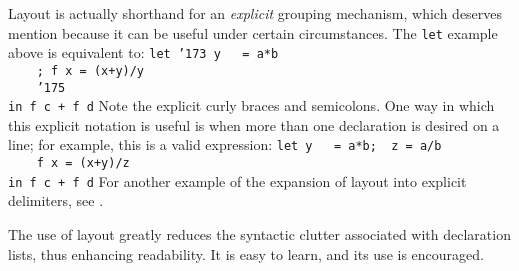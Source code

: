 Layout is actually shorthand for an {\em explicit} grouping mechanism,
which deserves mention because it can be useful under certain
circumstances.  The \mbox{\tt let} example above is equivalent to:
\bprog
\mbox{\tt let\ {\char'173}\ y\ \ \ =\ a*b}\\
\mbox{\tt \ \ \ \ ;\ f\ x\ =\ (x+y)/y}\\
\mbox{\tt \ \ \ \ {\char'175}}\\
\mbox{\tt in\ f\ c\ +\ f\ d}
\eprog
Note the explicit curly braces and semicolons.  One way in which this
explicit notation is useful is when more than one declaration is
desired on a line; for example, this is a valid expression:
\bprog
\mbox{\tt let\ y\ \ \ =\ a*b;\ \ z\ =\ a/b}\\
\mbox{\tt \ \ \ \ f\ x\ =\ (x+y)/z}\\
\mbox{\tt in\ f\ c\ +\ f\ d}
\eprog 
For another example of the expansion of layout into explicit
delimiters, see .

The use of layout greatly reduces the syntactic clutter associated
with declaration lists, thus enhancing readability.  It is easy to
learn, and its use is encouraged.

